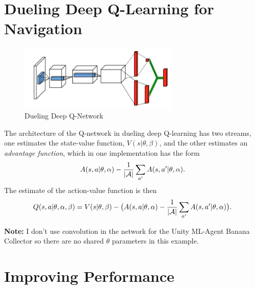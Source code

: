 \documentclass[tog]{acmsiggraph}
\begin{document}
\section{ Dueling Deep Q-Learning for Navigation}

\begin{figure}[h]
	\centering
	\includegraphics[width=3.0in]{images/dueling-dqn}
	\caption{Dueling Deep Q-Network~\protect\cite{DBLP:journals/corr/WangFL15}}
	\label{fig:ferrari}
\end{figure}

The architecture of the Q-network in dueling deep Q-learning has two streams, one estimates the state-value function, $V(s|\theta, \beta)$, and the other estimates an {\em advantage function},
which in one implementation has the form
$$A(s,a|\theta, \alpha) - \frac{1}{{\cal |A|}}\sum_{a'}A(s, a'|\theta, \alpha).$$
The estimate of the action-value function is then
$$Q(s,a|\theta, \alpha, \beta) = V(s|\theta, \beta) - \big(A(s,a|\theta, \alpha) - \frac{1}{{\cal |A|}}\sum_{a'}A(s, a'|\theta, \alpha)\big).$$

{\bf Note:} I don't use convolution in the network for the Unity ML-Agent Banana Collector so there are no shared $\theta$ parameters in this example.

\section{Improving Performance}






%

\end{document}
